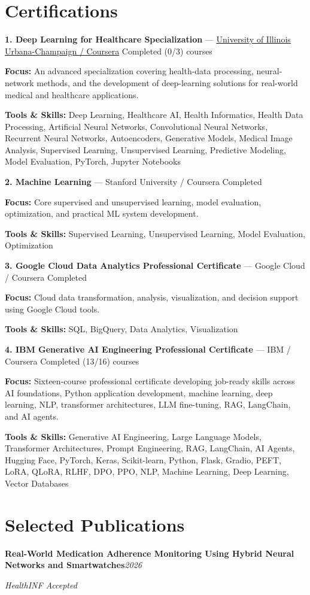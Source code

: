 \documentclass[9pt,letterpaper]{extarticle}
\newcommand{\entry}[2]{\Needspace{4\baselineskip}\textbf{#1}\hfill\textit{#2}\par}
\begin{document}
\section{Certifications}
\noindent\textbf{1. Deep Learning for Healthcare Specialization} {\small --- \textcolor{blue}{\underline{\href{https://www.coursera.org/specializations/deep-learning-healthcare}{University of Illinois Urbana-Champaign / Coursera}}} \textbar{} Completed (0/3) courses}\par
\textbf{Focus:} An advanced specialization covering health-data processing, neural-network methods, and the development of deep-learning solutions for real-world medical and healthcare applications.\par
{\small\textbf{Tools \& Skills:} Deep Learning, Healthcare AI, Health Informatics, Health Data Processing, Artificial Neural Networks, Convolutional Neural Networks, Recurrent Neural Networks, Autoencoders, Generative Models, Medical Image Analysis, Supervised Learning, Unsupervised Learning, Predictive Modeling, Model Evaluation, PyTorch, Jupyter Notebooks\par}
\vspace{2pt}
\noindent\textbf{2. Machine Learning} {\small --- Stanford University / Coursera \textbar{} Completed}\par
\textbf{Focus:} Core supervised and unsupervised learning, model evaluation, optimization, and practical ML system development.\par
{\small\textbf{Tools \& Skills:} Supervised Learning, Unsupervised Learning, Model Evaluation, Optimization\par}
\vspace{2pt}
\noindent\textbf{3. Google Cloud Data Analytics Professional Certificate} {\small --- Google Cloud / Coursera \textbar{} Completed}\par
\textbf{Focus:} Cloud data transformation, analysis, visualization, and decision support using Google Cloud tools.\par
{\small\textbf{Tools \& Skills:} SQL, BigQuery, Data Analytics, Visualization\par}
\vspace{2pt}
\noindent\textbf{4. IBM Generative AI Engineering Professional Certificate} {\small --- IBM / Coursera \textbar{} Completed (13/16) courses}\par
\textbf{Focus:} Sixteen-course professional certificate developing job-ready skills across AI foundations, Python application development, machine learning, deep learning, NLP, transformer architectures, LLM fine-tuning, RAG, LangChain, and AI agents.\par
{\small\textbf{Tools \& Skills:} Generative AI Engineering, Large Language Models, Transformer Architectures, Prompt Engineering, RAG, LangChain, AI Agents, Hugging Face, PyTorch, Keras, Scikit-learn, Python, Flask, Gradio, PEFT, LoRA, QLoRA, RLHF, DPO, PPO, NLP, Machine Learning, Deep Learning, Vector Databases\par}
\vspace{2pt}
\section{Selected Publications}
\entry{Real-World Medication Adherence Monitoring Using Hybrid Neural Networks and Smartwatches}{2026}
\textit{HealthINF \textbar{} Accepted}\par
\end{document}
